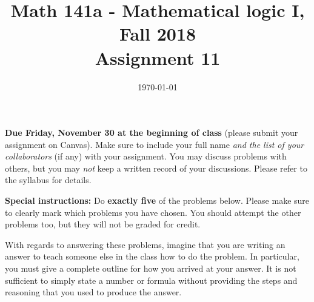 \documentclass{amsart}
\title[Math 141a, Fall 2018: assignment 11]{Math 141a - Mathematical logic I, Fall 2018 \\ Assignment 11}
\date{\today}
\theoremstyle{definition}
\begin{document}

\maketitle

\textbf{Due Friday, November 30 at the beginning of class} (please submit your assignment on Canvas). Make sure to include your full name \emph{and the list of your collaborators} (if any) with your assignment. You may discuss problems with others, but you may \emph{not} keep a written record of your discussions. Please refer to the syllabus for details.

\textbf{Special instructions:} Do \textbf{exactly five} of the problems below. Please make sure to clearly mark which problems you have chosen. You should attempt the other problems too, but they will not be graded for credit.

With regards to answering these problems, imagine that you are writing an answer to teach someone else in the class how to do the problem. In particular, you must give a complete outline for how you arrived at your answer. It is not sufficient to simply state a number or formula without providing the steps and reasoning that you used to produce the answer.
\end{document}
